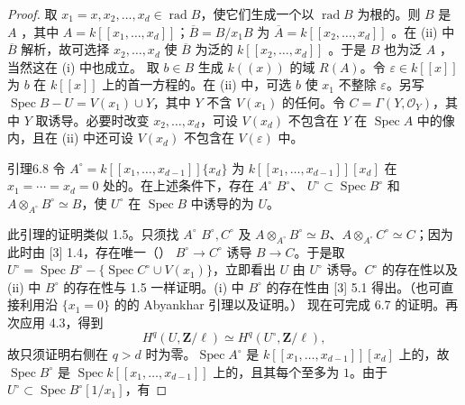\begin{proof}
取 $x_1=x,x_2,\ldots,x_d\in\operatorname{rad}B$，使它们生成一个以 $\operatorname{rad}B$ 为根的。则 $B$ 是 $A$ ，其中 $A=k[[x_1,\ldots,x_d]]$；$\overline B=B/x_1B$ 为 $\overline A=k[[x_2,\ldots,x_d]]$ 。在 (ii) 中 $\overline B$ 解析，故可选择 $x_2,\ldots,x_d$ 使 $\overline B$ 为泛的 $k[[x_2,\ldots,x_d]]$ 。于是 $B$ 也为泛 $A$ ，当然这在 (i) 中也成立。
取 $b\in B$ 生成 $k((x))$ 的域 $R(A)$。令 $\varepsilon\in k[[x]]$ 为 $b$ 在 $k[[x]]$ 上的首一方程的。在 (ii) 中，可选 $b$ 使 $x_1$ 不整除 $\varepsilon$。另写 $\operatorname{Spec}B-U=V(x_1)\cup Y$，其中 $Y$ 不含 $V(x_1)$ 的任何。令 $C=\Gamma(Y,\mathcal O_Y)$，其中 $Y$ 取诱导。必要时改变 $x_2,\ldots,x_d$，可设 $V(x_d)$ 不包含在 $Y$ 在 $\operatorname{Spec}A$ 中的像内，且在 (ii) 中还可设 $V(x_d)$ 不包含在 $V(\varepsilon)$ 中。
\begin{SGAresult}{引理}{6.8}
令 $A^\circ=k[[x_1,\ldots,x_{d-1}]]\{x_d\}$ 为 $k[[x_1,\ldots,x_{d-1}]][x_d]$ 在 $x_1=\cdots=x_d=0$ 处的。在上述条件下，存在 $A^\circ$ 
$B^\circ$、 $U^\circ\subset\operatorname{Spec}B^\circ$ 和 $A\otimes_{A^\circ}B^\circ\simeq B$，使 $U^\circ$ 在 $\operatorname{Spec}B$ 中诱导的为 $U$。
\end{SGAresult}
此引理的证明类似 1.5。只须找 $A^\circ$  $B^\circ,C^\circ$ 及 $A\otimes_{A^\circ}B^\circ\simeq B$、$A\otimes_{A^\circ}C^\circ\simeq C$；因为此时由 [3] 1.4，存在唯一（） $B^\circ\to C^\circ$ 诱导 $B\to C$。于是取 $U^\circ=\operatorname{Spec}B^\circ-\{\operatorname{Spec}C^\circ\cup V(x_1)\}$，立即看出 $U$ 由 $U^\circ$ 诱导。$C^\circ$ 的存在性以及 (ii) 中 $B^\circ$ 的存在性与 1.5 一样证明。(i) 中 $B^\circ$ 的存在性由 [3] 5.1 得出。（也可直接利用沿 $\{x_1=0\}$ 的的 Abyankhar 引理以及证明。）
现在可完成 6.7 的证明。再次应用 4.3，得到
\[H^q(U,\mathbf Z/\ell)\simeq H^q(U^\circ,\mathbf Z/\ell),\]
故只须证明右侧在 $q>d$ 时为零。$\operatorname{Spec}A^\circ$ 是 $k[[x_1,\ldots,x_{d-1}]][x_d]$ 上的，故 $\operatorname{Spec}B^\circ$ 是 $\operatorname{Spec}k[[x_1,\ldots,x_{d-1}]]$ 上的，且其每个至多为 $1$。由于 $U^\circ\subset\operatorname{Spec}B^\circ[1/x_1]$，有

\end{proof}
